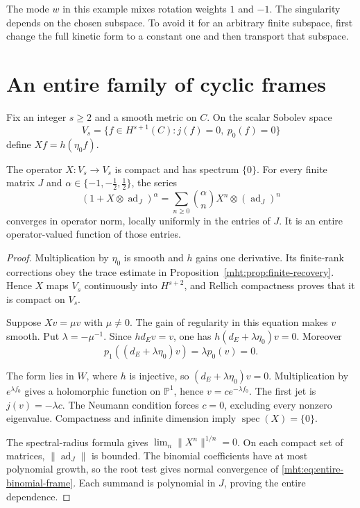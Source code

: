 The mode $w$ in this example mixes rotation weights $1$ and $-1$.
The singularity depends on the chosen subspace. To avoid it for an
arbitrary finite subspace, first change the full kinetic form to a
constant one and then transport that subspace.

\section{An entire family of cyclic frames}

Fix an integer $s\geq2$ and a smooth metric on $C$. On the scalar
Sobolev space
\[
 V_s=\{f\in H^{s+1}(C):j(f)=0,\ p_0(f)=0\}
\]
define $Xf=h(\eta_0f)$.

\begin{lemma}\label{mht:lem:quasinilpotent-green}
The operator $X:V_s\to V_s$ is compact and has spectrum $\{0\}$.
For every finite matrix $J$ and
$\alpha\in\{-1,-\tfrac12,\tfrac12\}$, the series
\begin{equation}\label{mht:eq:entire-binomial-frame}
 (1+X\otimes\operatorname{ad}_J)^\alpha
   =\sum_{n\geq0}\binom\alpha n X^n\otimes(\operatorname{ad}_J)^n
\end{equation}
converges in operator norm, locally uniformly in the entries of $J$.
It is an entire operator-valued function of those entries.
\end{lemma}

\begin{proof}
Multiplication by $\eta_0$ is smooth and $h$ gains one derivative.
Its finite-rank corrections obey the trace estimate in
Proposition~\ref{mht:prop:finite-recovery}. Hence $X$ maps $V_s$
continuously into $H^{s+2}$, and Rellich compactness proves that
it is compact on $V_s$.

Suppose $Xv=\mu v$ with $\mu\ne0$. The gain of regularity in this
equation makes $v$ smooth. Put $\lambda=-\mu^{-1}$. Since
$hd_Ev=v$, one has $h(d_E+\lambda\eta_0)v=0$. Moreover
\[
 p_1((d_E+\lambda\eta_0)v)=\lambda p_0(v)=0.
\]

The form lies in $W$, where $h$ is injective, so
$(d_E+\lambda\eta_0)v=0$. Multiplication by $e^{\lambda f_0}$
gives a holomorphic function on $\mathbb P^1$, hence
$v=ce^{-\lambda f_0}$. The first jet is $j(v)=-\lambda c$.
The Neumann condition forces $c=0$, excluding every nonzero
eigenvalue. Compactness and infinite dimension imply
$\operatorname{spec}(X)=\{0\}$.

The spectral-radius formula gives
$\lim_n\|X^n\|^{1/n}=0$. On each compact set of matrices,
$\|\operatorname{ad}_J\|$ is bounded. The binomial coefficients
have at most polynomial growth, so the root test gives normal
convergence of \eqref{mht:eq:entire-binomial-frame}. Each summand
is polynomial in $J$, proving the entire dependence.
\end{proof}

